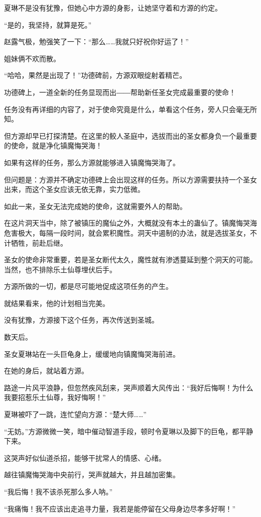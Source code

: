 \begin{this_body}
夏琳不是没有犹豫，但她心中方源的身影，让她坚守着和方源的约定。

“是的，我坚持，就算是死。”

赵露气极，勉强笑了一下：“那么……我就只好祝你好运了！”

姐妹俩不欢而散。

“哈哈，果然是出现了！”功德碑前，方源双眼绽射着精芒。

功德碑上，一道全新的任务显现而出――帮助新任圣女完成最重要的使命！

任务没有再详细的内容了，对于使命究竟是什么，单看这个任务，旁人只会毫无所知。

但方源却早已打探清楚。在这里的鲛人圣庭中，选拔而出的圣女都身负一个最重要的使命，就是净化镇魔悔哭海！

如果有这样的任务，那么方源就能够进入镇魔悔哭海了。

但问题是：方源并不确定功德碑上会出现这样的任务。所以方源需要扶持一个圣女出来，而这个圣女应该无依无靠，实力低微。

如此一来，圣女无法完成她的使命，这就需要外人的帮助。

在这片洞天当中，除了被镇压的魔仙之外，大概就没有本土的蛊仙了。镇魔悔哭海危害极大，每隔一段时间，就会累积魔性。洞天中遏制的办法，就是选拔圣女，不计牺牲，前赴后继。

圣女的使命非常重要，若是圣女断代太久，魔性就有渗透蔓延到整个洞天的可能。当然，也不排除乐土仙尊埋伏后手。

方源所做的一切，都是尽可能地促成这项任务的产生。

就结果看来，他的计划相当完美。

没有犹豫，方源接下这个任务，再次传送到圣城。

数天后。

圣女夏琳站在一头巨龟身上，缓缓地向镇魔悔哭海前进。

在她的身后，就站着方源。

路途一片风平浪静，但忽然疾风刮来，哭声顺着大风传出：“我好后悔啊！为什么我要招惹乐土仙尊，我好悔啊！”

夏琳被吓了一跳，连忙望向方源：“楚大师……”

“无妨。”方源微微一笑，暗中催动智道手段，顿时令夏琳以及脚下的巨龟，都平静下来。

这哭声好似仙道杀招，能够干扰常人的情感、心绪。

越往镇魔悔哭海中央前行，哭声就越大，并且越加密集。

“我后悔！我不该杀死那么多人呐。”

“我痛悔！我不应该出走追寻力量，我若是能停留在父母身边尽孝多好啊！”


\end{this_body}

